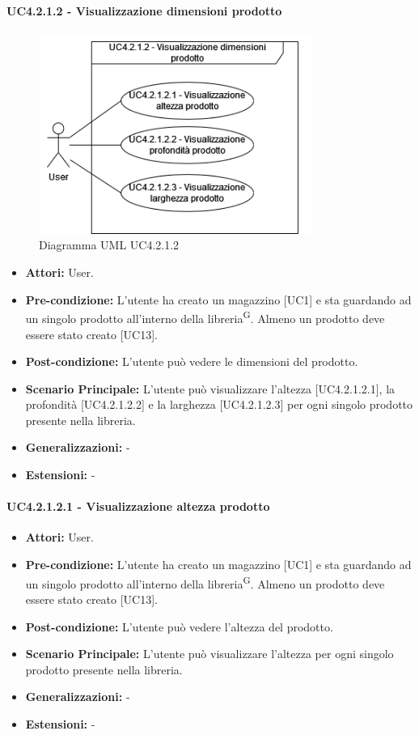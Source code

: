 \paragraph{UC4.2.1.2 - Visualizzazione dimensioni prodotto}
\begin{figure}[H]
  \centering
  \includegraphics[width=0.8\textwidth]{UC_diagrams_1-10/UC4.2.1.2.drawio.png}
   \caption{Diagramma UML UC4.2.1.2}
\end{figure}
\begin{itemize} 
    \item \textbf{Attori:} User.
    \item \textbf{Pre-condizione:} L'utente ha creato un magazzino [UC1] e sta guardando ad un singolo prodotto all'interno della libreria\textsuperscript{G}. Almeno un prodotto deve essere stato creato [UC13].
    \item \textbf{Post-condizione:}  L'utente può vedere le dimensioni del prodotto.
    \item \textbf{Scenario Principale:} L'utente può visualizzare l'altezza [UC4.2.1.2.1], la profondità [UC4.2.1.2.2] e la larghezza [UC4.2.1.2.3] per ogni singolo prodotto presente nella libreria. 
    \item \textbf{Generalizzazioni:} -
    \item \textbf{Estensioni:} -
\end{itemize}


\paragraph{UC4.2.1.2.1 - Visualizzazione altezza prodotto}
\begin{itemize} 
    \item \textbf{Attori:} User.
    \item \textbf{Pre-condizione:} L'utente ha creato un magazzino [UC1] e sta guardando ad un singolo prodotto all'interno della libreria\textsuperscript{G}. Almeno un prodotto deve essere stato creato [UC13].
    \item \textbf{Post-condizione:}  L'utente può vedere l'altezza del prodotto.
    \item \textbf{Scenario Principale:} L'utente può visualizzare l'altezza per ogni singolo prodotto presente nella libreria. 
    \item \textbf{Generalizzazioni:} -
    \item \textbf{Estensioni:} -
\end{itemize}


